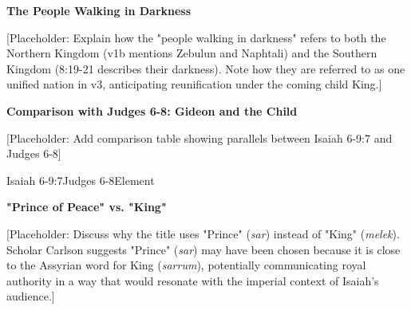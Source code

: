 \documentclass[11pt]{article}
\begin{document}
\vspace{3em}
{\large\bfseries The People Walking in Darkness}
\vspace{1em}

[Placeholder: Explain how the "people walking in darkness" refers to both the Northern Kingdom (v1b mentions Zebulun and Naphtali) and the Southern Kingdom (8:19-21 describes their darkness). Note how they are referred to as one unified nation in v3, anticipating reunification under the coming child King.]

\vspace{3em}
{\large\bfseries Comparison with Judges 6-8: Gideon and the Child}
\vspace{1em}

[Placeholder: Add comparison table showing parallels between Isaiah 6-9:7 and Judges 6-8]

\begin{comparisontable}{Isaiah 6-9:7}{Judges 6-8}{Element}





\end{comparisontable}

\vspace{3em}
{\large\bfseries "Prince of Peace" vs. "King"}
\vspace{1em}

[Placeholder: Discuss why the title uses "Prince" (\textit{sar}) instead of "King" (\textit{melek}). Scholar Carlson suggests "Prince" (\textit{sar}) may have been chosen because it is close to the Assyrian word for King (\textit{sarrum}), potentially communicating royal authority in a way that would resonate with the imperial context of Isaiah's audience.]
\end{document}
